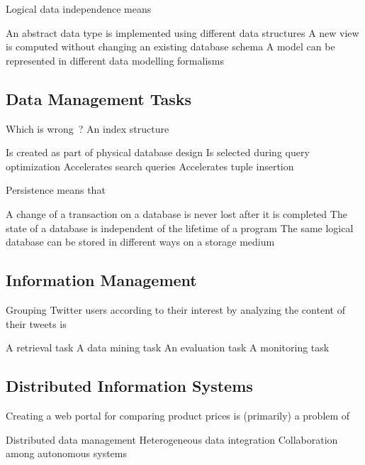 \documentclass[12pt,a4paper,answers]{exam} %
\begin{document}
\begin{flushleft}
\begin{multicols*}{2}
\begin{questions}
\question Logical data independence means
\begin{checkboxes}
\choice An abstract data type is implemented using different data structures
\choice A new view is computed without changing an existing database schema
\choice A model can be represented in different data modelling formalisms
\end{checkboxes}


\subsection{Data Management Tasks}

\question Which is wrong~? An index structure
\begin{checkboxes}
\choice Is created as part of physical database design
\choice Is selected during query optimization
\choice Accelerates search queries
\choice Accelerates tuple insertion
\end{checkboxes}

\question Persistence means that
\begin{checkboxes}
\choice A change of a transaction on a database is never lost after it is completed
\choice The state of a database is independent of the lifetime of a program
\choice The same logical database can be stored in different ways on a storage medium
\end{checkboxes}


\subsection{Information Management}

\question Grouping Twitter users according to their interest by analyzing the content of their tweets is
\begin{checkboxes}
\choice A retrieval task
\choice A data mining task
\choice An evaluation task
\choice A monitoring task
\end{checkboxes}


\subsection{Distributed Information Systems}

\question Creating a web portal for comparing product prices is (primarily) a problem of
\begin{checkboxes}
\choice Distributed data management
\choice Heterogeneous data integration
\choice Collaboration among autonomous systems
\end{checkboxes}



\end{questions}
\end{multicols*}
\end{flushleft}
\end{document}
